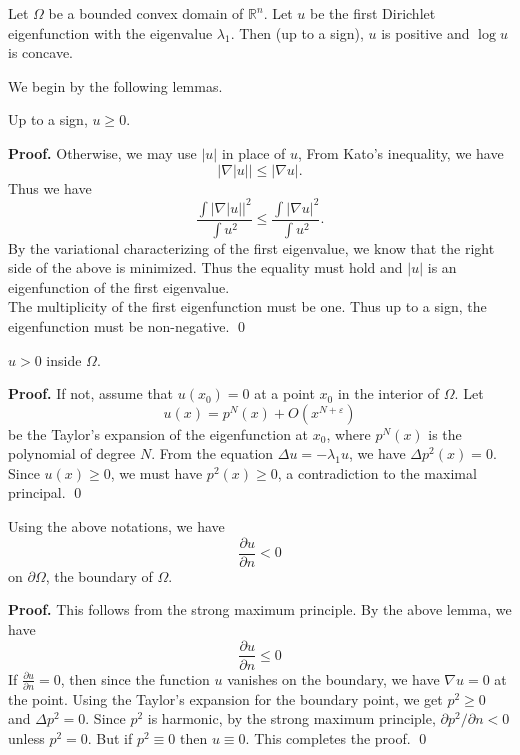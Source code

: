 \begin{theorem}
Let $\Omega$ be a bounded convex domain of $\mathbb{R}^n$. Let $u$ be the first
Dirichlet eigenfunction with the eigenvalue $\lambda_1$. Then (up to a sign),
$u$ is positive and $\log u$ is concave.
\end{theorem}

We begin by the following lemmas.
\begin{lemma}
Up to a sign, $u \geqslant 0$.
\end{lemma}
{\bf Proof.}
Otherwise, we may use $|u|$ in place of $u$, From Kato's inequality, we have
\[
|\nabla|u|| \leqslant |\nabla u|.
\]
Thus we have
\[
\frac{\int |\nabla|u||^2}{\int u^2} \leqslant \frac{\int |\nabla u|^2}{\int u^2}.
\]
By the variational characterizing of the first eigenvalue, we know that the
right side of the above is minimized. Thus the equality must hold and $|u|$ is an
eigenfunction of the first eigenvalue.
\\

The multiplicity of the first eigenfunction must be one. Thus up to a sign, the
eigenfunction must be non-negative.
\qed

\begin{lemma}
$u > 0$ inside $\Omega$.
\end{lemma}
{\bf Proof.}
If not, assume that $u(x_0) = 0$ at a point $x_0$ in the interior of $\Omega$.
Let
\[
u(x) = p^N(x) + O(x^{N+\varepsilon})
\]
be the Taylor's expansion of the eigenfunction at $x_0$, where $p^N(x)$ is the
polynomial of degree $N$. From the equation $\Delta u = -\lambda_1 u$, we have
$\Delta p^2(x) = 0$. Since $u(x) \geqslant 0$, we must have $p^2(x)\geqslant 0$,
a contradiction to the maximal principal.
\qed

\begin{lemma}
Using the above notations, we have
\[
\frac{\partial u}{\partial n} < 0
\]
on $\partial\Omega$, the boundary of $\Omega$.
\end{lemma}
{\bf Proof.}
This follows from the strong maximum principle. By the above lemma, we have
\[
\frac{\partial u}{\partial n} \leqslant 0
\]
If $\frac{\partial u}{\partial n} = 0$, then since the function $u$ vanishes on
the boundary, we have $\nabla u = 0$ at the point. Using the Taylor's expansion
for the boundary point, we get $p^2 \geqslant 0$ and $\Delta p^2 = 0$. Since $p^2$ is harmonic, by the
strong maximum principle, $\partial p^2/\partial n < 0$ unless $p^2 =0$. But if
$p^2 \equiv 0$ then $u \equiv 0$. This completes the proof.
\qed


